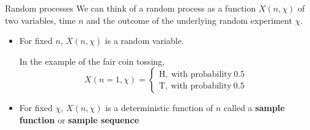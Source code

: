 \documentclass[10pt]{beamer}
\begin{document}
\begin{frame}{Random processes}
We can think of a random process as a function $X(n, \chi)$ of two variables, time $n$ and the outcome of the underlying random experiment $\chi$. 
\begin{itemize}
	\pause\item For fixed $n$, $X(n, \chi)$ is a random variable.
	
	In the example of the fair coin tossing, 
	\begin{equation*}
	X(n=1, \chi) = \begin{cases}
	\mathrm{H},~\text{with probability}~0.5 \\
	\mathrm{T},~\text{with probability}~0.5
	\end{cases}
	\end{equation*}
	\pause\item For fixed $\chi$, $X(n, \chi)$ is a deterministic function of $n$ called a \textbf{sample function} or \textbf{sample sequence}
	

\end{itemize}
\end{frame}
\end{document}
